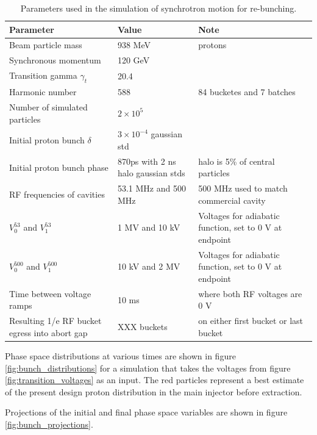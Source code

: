 \begin{table}[h!]
\begin{tabular}{|p{}|p{}|p{}|}\hline
\textbf{Parameter} & \textbf{Value} & \textbf{Note} \\ \hline
Beam particle mass & 938 MeV  & protons \\ \hline
Synchronous momentum & 120 GeV & \\ \hline
Transition gamma $\gamma _t$ & 20.4 & \\ \hline
Harmonic number & 588 & 84 bucketes and 7 batches\\ \hline
Number of simulated particles & $2\times10^5$ & \\ \hline
Initial proton bunch $\delta$ & $3\times10^{-4}$ gaussian std & \\ \hline
Initial proton bunch phase & 870ps with 2 ns halo gaussian stds & halo is 5\% of central particles \\ \hline \hline
RF frequencies of cavities & 53.1 MHz and 500 MHz & 500 MHz used to match commercial cavity \\ \hline
$V_0 ^{53}$ and $V_1 ^{53}$ & 1 MV and 10 kV & Voltages for adiabatic function, set to 0 V at endpoint \\ \hline
$V_0 ^{500}$ and $V_1 ^{500}$ & 10 kV and 2 MV & Voltages for adiabatic function, set to 0 V at endpoint \\ \hline
Time between voltage ramps & 10 ms & where both RF voltages are 0 V \\ \hline
Resulting 1/e RF bucket egress into abort gap & XXX buckets & on either first bucket or last bucket \\ \hline
\end{tabular}
\caption{Parameters used in the simulation of synchrotron motion for re-bunching.}\label{tab:accsim_parameters}
\end{table}

Phase space distributions at various times are shown in figure
\ref{fig:bunch_distributions} for a simulation that takes the voltages
from figure \ref{fig:transition_voltages} as an input. The red
particles represent a best estimate of the present design proton
distribution in the main injector before extraction. 

Projections of the initial and final phase space variables
are shown in figure \ref{fig:bunch_projections}. 

